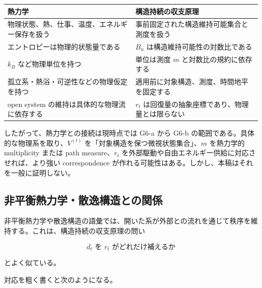\documentclass[12pt,a4paper]{article}
\begin{document}
{\def\LTcaptype{table} %
\begin{longtable}[]{@{}
  >{\raggedright\arraybackslash}p{}
  >{\raggedright\arraybackslash}p{}@{}}
\toprule\noalign{}
\begin{minipage}[b]{\linewidth}\raggedright
熱力学
\end{minipage} & \begin{minipage}[b]{\linewidth}\raggedright
構造持続の収支原理
\end{minipage} \\
\midrule\noalign{}
\endhead
\bottomrule\noalign{}
\endlastfoot
物理状態、熱、仕事、温度、エネルギー保存を扱う & 事前固定された構造維持可能集合と測度を扱う \\
エントロピーは物理的状態量である & \(B_n\) は構造維持可能性の対数比である \\
\(k_B\) など物理単位を持つ & 単位は測度 \(m\) と対数比の規約に依存する \\
孤立系・熱浴・可逆性などの物理仮定を持つ & 適用前に対象構造、測度、時間地平を固定する \\
open system の維持は具体的な物理流に依存する & \(r_t\) は回復量の抽象座標であり、物理量とは限らない \\
\end{longtable}
}

したがって、熱力学との接続は現時点では G6-a から G6-b の範囲である。具体的な物理系を取り、\(V^{(t)}\) を「対象構造を保つ微視状態集合」、\(m\) を熱力学的 multiplicity または path measure、\(r_{t}\) を外部駆動や自由エネルギー供給に対応させれば、より強い correspondence が作れる可能性はある。しかし、本稿はそれを一般に証明しない。

\subsection{非平衡熱力学・散逸構造との関係}\label{ux975eux5e73ux8861ux71b1ux529bux5b66ux6563ux9038ux69cbux9020ux3068ux306eux95a2ux4fc2}

非平衡熱力学や散逸構造の語彙では、開いた系が外部との流れを通じて秩序を維持する。これは、構造持続の収支原理の問い

\[
d_{t} \text{ を } r_{t} \text{ がどれだけ補えるか}
\]

とよく似ている。

対応を粗く書くと次のようになる。
\end{document}
